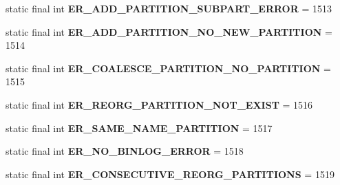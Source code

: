 \begin{DoxyCompactItemize}
static final int {\bfseries E\+R\+\_\+\+A\+D\+D\+\_\+\+P\+A\+R\+T\+I\+T\+I\+O\+N\+\_\+\+S\+U\+B\+P\+A\+R\+T\+\_\+\+E\+R\+R\+OR} = 1513
\item 
\mbox{\label{classcom_1_1mysql_1_1jdbc_1_1_mysql_error_numbers_a9dbf7cc2e38c5cbad0aca9bd062ad234}} 
static final int {\bfseries E\+R\+\_\+\+A\+D\+D\+\_\+\+P\+A\+R\+T\+I\+T\+I\+O\+N\+\_\+\+N\+O\+\_\+\+N\+E\+W\+\_\+\+P\+A\+R\+T\+I\+T\+I\+ON} = 1514
\item 
\mbox{\label{classcom_1_1mysql_1_1jdbc_1_1_mysql_error_numbers_ae500899365121809c885a43ec140ba40}} 
static final int {\bfseries E\+R\+\_\+\+C\+O\+A\+L\+E\+S\+C\+E\+\_\+\+P\+A\+R\+T\+I\+T\+I\+O\+N\+\_\+\+N\+O\+\_\+\+P\+A\+R\+T\+I\+T\+I\+ON} = 1515
\item 
\mbox{\label{classcom_1_1mysql_1_1jdbc_1_1_mysql_error_numbers_add88530fcc6140c7c84ce9f73b2f15cf}} 
static final int {\bfseries E\+R\+\_\+\+R\+E\+O\+R\+G\+\_\+\+P\+A\+R\+T\+I\+T\+I\+O\+N\+\_\+\+N\+O\+T\+\_\+\+E\+X\+I\+ST} = 1516
\item 
\mbox{\label{classcom_1_1mysql_1_1jdbc_1_1_mysql_error_numbers_a8a2b0aae62dfd2c9f06cfdeb029513a7}} 
static final int {\bfseries E\+R\+\_\+\+S\+A\+M\+E\+\_\+\+N\+A\+M\+E\+\_\+\+P\+A\+R\+T\+I\+T\+I\+ON} = 1517
\item 
\mbox{\label{classcom_1_1mysql_1_1jdbc_1_1_mysql_error_numbers_a8b72ce63fb0325a45fe54c2b353f834f}} 
static final int {\bfseries E\+R\+\_\+\+N\+O\+\_\+\+B\+I\+N\+L\+O\+G\+\_\+\+E\+R\+R\+OR} = 1518
\item 
\mbox{\label{classcom_1_1mysql_1_1jdbc_1_1_mysql_error_numbers_a4310e80b510b333a347c9bf58e55599f}} 
static final int {\bfseries E\+R\+\_\+\+C\+O\+N\+S\+E\+C\+U\+T\+I\+V\+E\+\_\+\+R\+E\+O\+R\+G\+\_\+\+P\+A\+R\+T\+I\+T\+I\+O\+NS} = 1519
\item 
\mbox{\label{classcom_1_1mysql_1_1jdbc_1_1_mysql_error_numbers_a8724e24483e5a14e1bcfe53167aec314}} 

\end{DoxyCompactItemize}
